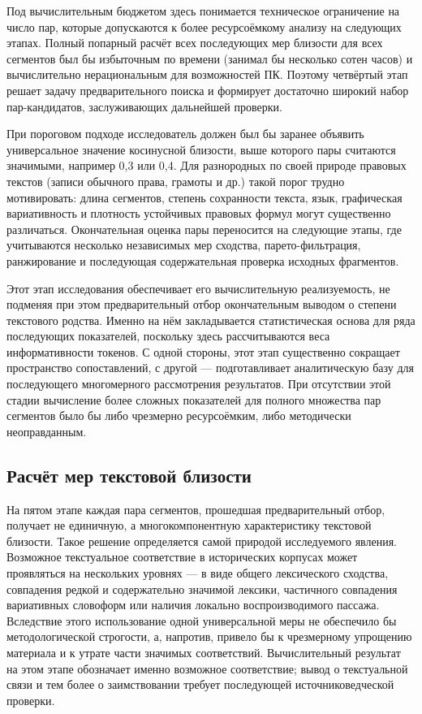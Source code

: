 Под вычислительным бюджетом здесь понимается техническое ограничение на число пар, которые допускаются к более ресурсоёмкому анализу на следующих этапах. Полный попарный расчёт всех последующих мер близости для всех сегментов был бы избыточным по времени (занимал бы несколько сотен часов) и вычислительно нерациональным для возможностей ПК. Поэтому четвёртый этап решает задачу предварительного поиска и формирует достаточно широкий набор пар-кандидатов, заслуживающих дальнейшей проверки.

При пороговом подходе исследователь должен был бы заранее объявить универсальное значение косинусной близости, выше которого пары считаются значимыми, например 0,3 или 0,4. Для разнородных по своей природе правовых текстов (записи обычного права, грамоты и др.) такой порог трудно мотивировать: длина сегментов, степень сохранности текста, язык, графическая вариативность и плотность устойчивых правовых формул могут существенно различаться. Окончательная оценка пары переносится на следующие этапы, где учитываются несколько независимых мер сходства, парето-фильтрация, ранжирование и последующая содержательная проверка исходных фрагментов.

Этот этап исследования обеспечивает его вычислительную реализуемость, не подменяя при этом предварительный отбор окончательным выводом о степени текстового родства. Именно на нём закладывается статистическая основа для ряда последующих показателей, поскольку здесь рассчитываются веса информативности токенов. С одной стороны, этот этап существенно сокращает пространство сопоставлений, с другой --- подготавливает аналитическую базу для последующего многомерного рассмотрения результатов. При отсутствии этой стадии вычисление более сложных показателей для полного множества пар сегментов было бы либо чрезмерно ресурсоёмким, либо методически неоправданным.

\subsection{Расчёт мер текстовой близости}

На пятом этапе каждая пара сегментов, прошедшая предварительный отбор, получает не единичную, а многокомпонентную характеристику текстовой близости. Такое решение определяется самой природой исследуемого явления. Возможное текстуальное соответствие в исторических корпусах может проявляться на нескольких уровнях --- в виде общего лексического сходства, совпадения редкой и содержательно значимой лексики, частичного совпадения вариативных словоформ или наличия локально воспроизводимого пассажа. Вследствие этого использование одной универсальной меры не обеспечило бы методологической строгости, а, напротив, привело бы к чрезмерному упрощению материала и к утрате части значимых соответствий. Вычислительный результат на этом этапе обозначает именно возможное соответствие; вывод о текстуальной связи и тем более о заимствовании требует последующей источниковедческой проверки.

